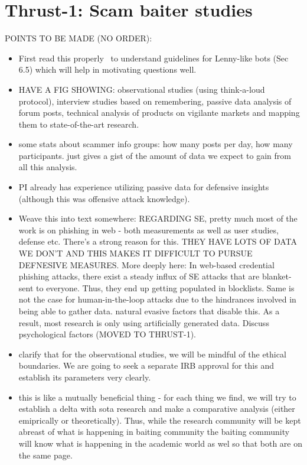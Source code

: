 \section{Thrust-1: Scam baiter studies}
\label{sec:thrust_one}


POINTS TO BE MADE (NO ORDER):

\begin{itemize}

\item First read this properly~\cite{SahinRF17} to understand guidelines for Lenny-like bots (Sec 6.5) which will help in motivating questions well.

\item HAVE A FIG SHOWING: observational studies (using think-a-loud protocol), interview studies based on remembering, passive data analysis of forum posts, technical analysis of products on vigilante markets and mapping them to state-of-the-art research. 

\item some stats about scammer info groups: how many posts per day, how many participants. just gives a gist of the amount of data we expect to gain from all this analysis. 

\item PI already has experience utilizing passive data for defensive insights~\cite{tasr} (although this was offensive attack knowledge). 

\item Weave this into text somewhere: REGARDING SE, pretty much most of the work is on phishing in web - both measurements as well as user studies, defense etc. There's a strong reason for this. THEY HAVE LOTS OF DATA WE DON'T AND THIS MAKES IT DIFFICULT TO PURSUE DEFNESIVE MEASURES. More deeply here: In web-based credential phishing attacks, there exist a steady influx of SE attacks that are blanket-sent to everyone. Thus, they end up getting populated in blocklists. Same is not the case for human-in-the-loop attacks due to the hindrances involved in being able to gather data. natural evasive factors that disable this. As a result, most research is only using artificially generated data.   Discuss psychological factors (MOVED TO THRUST-1). 

\item clarify that for the observational studies, we will be mindful of the ethical boundaries. We are going to seek a separate IRB approval for this and establish its parameters very clearly. 

\item this is like a mutually beneficial thing - for each thing we find, we will try to establish a delta with sota research and make a comparative analysis (either emiprically or theoretically). Thus, while the research community will be kept abreast of what is happening in baiting community the baiting community will know what is happening in the academic world as wel so that both are on the same page. 



\end{itemize}

